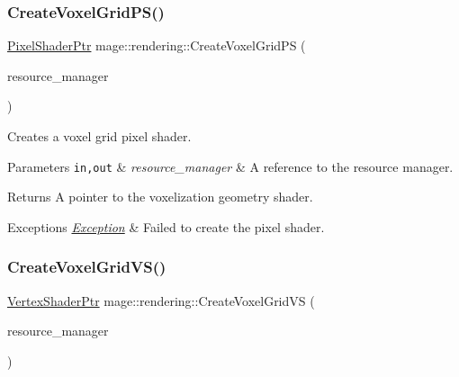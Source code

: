 \subsubsection{\texorpdfstring{Create\+Voxel\+Grid\+P\+S()}{CreateVoxelGridPS()}}
{\footnotesize\ttfamily \mbox{\hyperlink{namespacemage_1_1rendering_af03d922b228ee9c8542baaa2ecc9f259}{Pixel\+Shader\+Ptr}} mage\+::rendering\+::\+Create\+Voxel\+Grid\+PS (\begin{DoxyParamCaption}\item[{\mbox{\hyperlink{classmage_1_1rendering_1_1_resource_manager}{Resource\+Manager}} \&}]{resource\+\_\+manager }\end{DoxyParamCaption})}

Creates a voxel grid pixel shader.


\begin{DoxyParams}[1]{Parameters}
\mbox{\tt in,out}  & {\em resource\+\_\+manager} & A reference to the resource manager. \\
\hline
\end{DoxyParams}
\begin{DoxyReturn}{Returns}
A pointer to the voxelization geometry shader. 
\end{DoxyReturn}

\begin{DoxyExceptions}{Exceptions}
{\em \mbox{\hyperlink{classmage_1_1_exception}{Exception}}} & Failed to create the pixel shader. \\
\hline
\end{DoxyExceptions}
\mbox{\label{namespacemage_1_1rendering_ac3e99cb1d1c322bfc84a95932533af94}} 
\subsubsection{\texorpdfstring{Create\+Voxel\+Grid\+V\+S()}{CreateVoxelGridVS()}}
{\footnotesize\ttfamily \mbox{\hyperlink{namespacemage_1_1rendering_aaf704b9c54a4181f4950a1761de69dda}{Vertex\+Shader\+Ptr}} mage\+::rendering\+::\+Create\+Voxel\+Grid\+VS (\begin{DoxyParamCaption}\item[{\mbox{\hyperlink{classmage_1_1rendering_1_1_resource_manager}{Resource\+Manager}} \&}]{resource\+\_\+manager }\end{DoxyParamCaption})}

